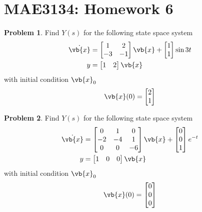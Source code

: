 \documentclass[10pt]{article}
\date{}
\theoremstyle{definition}
\newtheorem{prob}{Problem}[section]
\begin{document}
\pagestyle{empty}
\section*{MAE3134: Homework 6}
\vspace*{-0.4cm}

\begin{prob}
    Find \( Y(s) \) for the following state space system
    \begin{align*}
        \dot{\vb{x}} &= \begin{bmatrix}
            1 & 2 \\ -3 & -1
        \end{bmatrix} \vb{x} + \begin{bmatrix} 1 \\ 1 \end{bmatrix} \sin 3t \\
        y &= \begin{bmatrix} 1 & 2 \end{bmatrix}  \vb{x} 
    \end{align*}
    with initial condition \( \vb{x}_0 \)
    \begin{align*}
        \vb{x}(0) = \begin{bmatrix} 2 \\ 1\end{bmatrix}
    \end{align*}
\end{prob}

\begin{prob}
    Find \( Y(s) \) for the following state space system
    \begin{align*}
        \dot{\vb{x}} &= \begin{bmatrix} 0 & 1 & 0 \\ -2 & -4 & 1 \\ 0 & 0 & -6 \end{bmatrix} \vb{x} + \begin{bmatrix}0 \\ 0 \\ 1\end{bmatrix} e^{-t}\\
        y &= \begin{bmatrix} 1 & 0 & 0 \end{bmatrix}  \vb{x} 
    \end{align*}
    with initial condition \( \vb{x}_0 \)
    \begin{align*}
        \vb{x}(0) = \begin{bmatrix}0 \\ 0 \\ 0 \end{bmatrix}
    \end{align*}
\end{prob}
\end{document}
